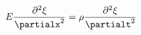 \documentclass[preview]{standalone}
\begin{document}
\begin{align*}
E \frac{\partial^2\xi}{\partialx^2} = \rho\frac{\partial^2\xi}{\partialt^2}
\end{align*}
\end{document}
